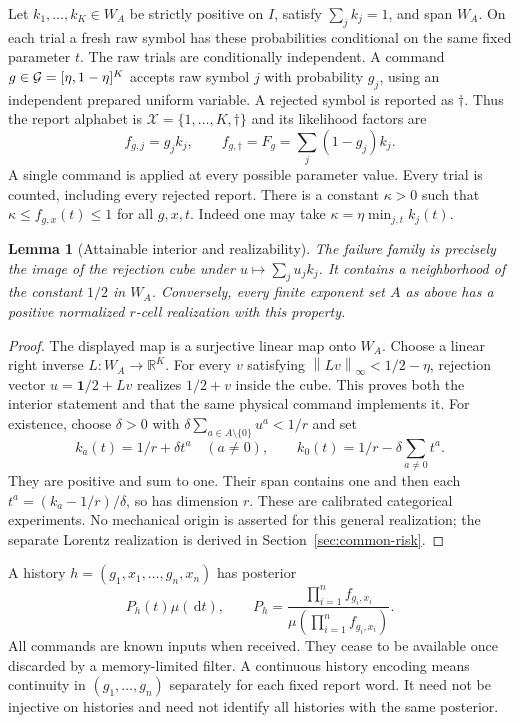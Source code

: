 \documentclass[11pt]{amsart}
\newtheorem{lemma}[theorem]{Lemma}
\theoremstyle{definition}\newtheorem{definition}[theorem]{Definition}
\theoremstyle{remark}\newtheorem{remark}[theorem]{Remark}
\newcommand{\R}{\mathbb R}\newcommand{\N}{\mathbb N}\newcommand{\C}{\mathbb C}
\newcommand{\one}{\mathbf 1}\newcommand{\dd}{\,\mathrm d}
\newcommand{\cX}{\mathcal X}\newcommand{\cS}{\mathcal S}
\newcommand{\norm}[1]{\left\lVert#1\right\rVert}
\begin{document}
Let $k_1,\ldots,k_K\in W_A$ be strictly positive on $I$, satisfy
$\sum_jk_j=1$, and span $W_A$. On each trial a fresh raw symbol has these
probabilities conditional on the same fixed parameter $t$. The raw trials
are conditionally independent. A command
$g\in\mathcal G=[\eta,1-\eta]^K$ accepts raw symbol $j$ with probability $g_j$,
using an independent prepared uniform variable. A rejected symbol is
reported as $\dagger$. Thus the report alphabet is
$\cX=\{1,\ldots,K,\dagger\}$ and its likelihood factors are
\begin{equation}\label{eq:channel}
 f_{g,j}=g_jk_j,\qquad
 f_{g,\dagger}=F_g=\sum_j(1-g_j)k_j.
\end{equation}
A single command is applied at every possible parameter value. Every
trial is counted, including every rejected report. There is a constant
$\kappa>0$ such that $\kappa\le f_{g,x}(t)\le1$ for all $g,x,t$.
Indeed one may take $\kappa=\eta\min_{j,t}k_j(t)$.

\begin{lemma}[Attainable interior and realizability]\label{lem:interior}
The failure family is precisely the image of the rejection cube under
$u\mapsto\sum_ju_jk_j$. It contains a neighborhood of the constant $1/2$
in $W_A$. Conversely, every finite exponent set $A$ as above has a positive
normalized $r$-cell realization with this property.
\end{lemma}
\begin{proof}
The displayed map is a surjective linear map onto $W_A$. Choose a linear
right inverse $L:W_A\to\R^K$. For every $v$ satisfying
$\norm{Lv}_\infty<1/2-\eta$, rejection vector
$u=\one/2+Lv$ realizes $1/2+v$ inside the cube. This proves both the
interior statement and that the same physical command implements it.
For existence, choose $\delta>0$ with
$\delta\sum_{a\in A\setminus\{0\}}u^a<1/r$ and set
\[
 k_a(t)=1/r+\delta t^a\quad(a\ne0),\qquad
 k_0(t)=1/r-\delta\sum_{a\ne0}t^a.
\]
They are positive and sum to one. Their span contains one and then each
$t^a=(k_a-1/r)/\delta$, so has dimension $r$. These are calibrated
categorical experiments. No mechanical origin is asserted for this general
realization; the separate Lorentz realization is derived in
Section~\ref{sec:common-risk}.
\end{proof}

A history $h=(g_1,x_1,\ldots,g_n,x_n)$ has posterior
\begin{equation}\label{eq:posterior}
 P_h(t)\mu(\dd t),\qquad
 P_h=\frac{\prod_{i=1}^nf_{g_i,x_i}}{\mu(\prod_{i=1}^nf_{g_i,x_i})}.
\end{equation}
All commands are known inputs when received. They cease to be available
once discarded by a memory-limited filter. A continuous history encoding
means continuity in $(g_1,\ldots,g_n)$ separately for each fixed report
word. It need not be injective on histories and need not identify all
histories with the same posterior.
\end{document}
